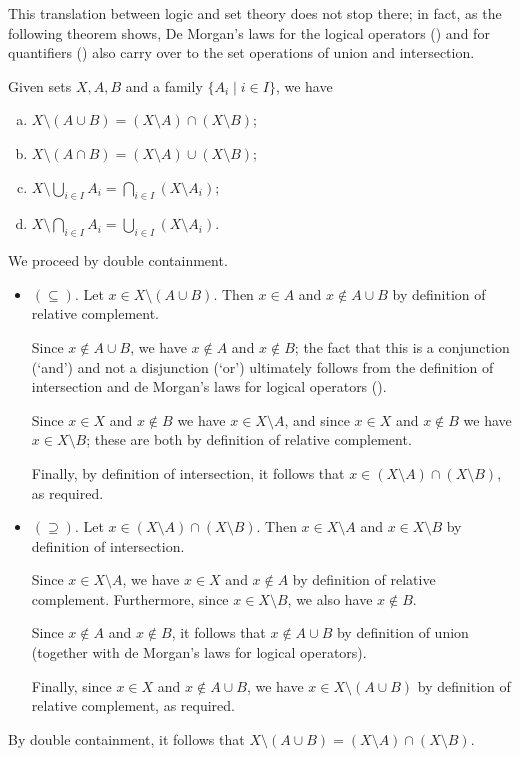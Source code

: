 This translation between logic and set theory does not stop there; in fact, as the following theorem shows, De Morgan's laws for the logical operators () and for quantifiers () also carry over to the set operations of union and intersection.

\begin{theorem}
\label{thmDeMorganForSets}
Given sets $X,A,B$ and a family $\{ A_i \mid i \in I \}$, we have
\begin{enumerate}[(a)] 
\item $X \setminus (A \cup B) = (X \setminus A) \cap (X \setminus B)$;
\item $X \setminus (A \cap B) = (X \setminus A) \cup (X \setminus B)$;
\item $\displaystyle X \setminus \bigcup_{i \in I} A_i = \bigcap_{i \in I} (X \setminus A_i)$;
\item $\displaystyle X \setminus \bigcap_{i \in I} A_i = \bigcup_{i \in I} (X \setminus A_i)$.
\end{enumerate}
\end{theorem}

\begin{cproof}[of (a)]
We proceed by double containment.
\begin{itemize}
\item{} $(\subseteq)$. Let $x \in X \setminus (A \cup B)$. Then $x \in A$ and $x \not\in A \cup B$ by definition of relative complement.

Since $x \not\in A \cup B$, we have $x \not\in A$ and $x \not\in B$; the fact that this is a conjunction (`and') and not a disjunction (`or') ultimately follows from the definition of intersection and de Morgan's laws for logical operators ().

Since $x \in X$ and $x \not\in B$ we have $x \in X \setminus A$, and since $x \in X$ and $x \not\in B$ we have $x \in X \setminus B$; these are both by definition of relative complement.

Finally, by definition of intersection, it follows that $x \in (X \setminus A) \cap (X \setminus B)$, as required.
\item{} $(\supseteq)$. Let $x \in (X \setminus A) \cap (X \setminus B)$. Then $x \in X \setminus A$ and $x \in X \setminus B$ by definition of intersection.

Since $x \in X \setminus A$, we have $x \in X$ and $x \not\in A$ by definition of relative complement. Furthermore, since $x \in X \setminus B$, we also have $x \not\in B$.

Since $x \not\in A$ and $x \not\in B$, it follows that $x \not\in A \cup B$ by definition of union (together with de Morgan's laws for logical operators).

Finally, since $x \in X$ and $x \not\in A \cup B$, we have $x \in X \setminus (A \cup B)$ by definition of relative complement, as required.
\end{itemize}
By double containment, it follows that $X \setminus (A \cup B) = (X \setminus A) \cap (X \setminus B)$.
\end{cproof}

